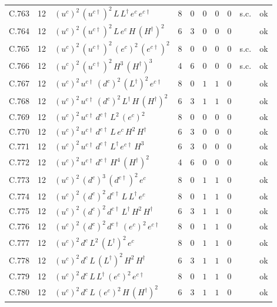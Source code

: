 {\begin{longtable}{@{}ll>{\raggedright\arraybackslash}p{6.4cm}rrllllr@{}}
C.763 & 12 & $(u^c)^{2}\,(u^{c\dagger})^{2}\,L\,L^\dagger\,e^c\,e^{c\dagger}$ & 8 & 0 & $0$ & $0$ & $0$ & s.c. & ok \\
C.764 & 12 & $(u^c)^{2}\,(u^{c\dagger})^{2}\,L\,e^c\,H\,(H^\dagger)^{2}$ & 6 & 3 & $0$ & $0$ & $0$ &  & ok \\
C.765 & 12 & $(u^c)^{2}\,(u^{c\dagger})^{2}\,(e^c)^{2}\,(e^{c\dagger})^{2}$ & 8 & 0 & $0$ & $0$ & $0$ & s.c. & ok \\
C.766 & 12 & $(u^c)^{2}\,(u^{c\dagger})^{2}\,H^{3}\,(H^\dagger)^{3}$ & 4 & 6 & $0$ & $0$ & $0$ & s.c. & ok \\
C.767 & 12 & $(u^c)^{2}\,u^{c\dagger}\,(d^c)^{2}\,(L^\dagger)^{2}\,e^{c\dagger}$ & 8 & 0 & $1$ & $1$ & $0$ &  & ok \\
C.768 & 12 & $(u^c)^{2}\,u^{c\dagger}\,(d^c)^{2}\,L^\dagger\,H\,(H^\dagger)^{2}$ & 6 & 3 & $1$ & $1$ & $0$ &  & ok \\
C.769 & 12 & $(u^c)^{2}\,u^{c\dagger}\,d^{c\dagger}\,L^{2}\,(e^c)^{2}$ & 8 & 0 & $0$ & $0$ & $0$ &  & ok \\
C.770 & 12 & $(u^c)^{2}\,u^{c\dagger}\,d^{c\dagger}\,L\,e^c\,H^{2}\,H^\dagger$ & 6 & 3 & $0$ & $0$ & $0$ &  & ok \\
C.771 & 12 & $(u^c)^{2}\,u^{c\dagger}\,d^{c\dagger}\,L^\dagger\,e^{c\dagger}\,H^{3}$ & 6 & 3 & $0$ & $0$ & $0$ &  & ok \\
C.772 & 12 & $(u^c)^{2}\,u^{c\dagger}\,d^{c\dagger}\,H^{4}\,(H^\dagger)^{2}$ & 4 & 6 & $0$ & $0$ & $0$ &  & ok \\
C.773 & 12 & $(u^c)^{2}\,(d^c)^{3}\,(d^{c\dagger})^{2}\,e^c$ & 8 & 0 & $1$ & $1$ & $0$ &  & ok \\
C.774 & 12 & $(u^c)^{2}\,(d^c)^{2}\,d^{c\dagger}\,L\,L^\dagger\,e^c$ & 8 & 0 & $1$ & $1$ & $0$ &  & ok \\
C.775 & 12 & $(u^c)^{2}\,(d^c)^{2}\,d^{c\dagger}\,L^\dagger\,H^{2}\,H^\dagger$ & 6 & 3 & $1$ & $1$ & $0$ &  & ok \\
C.776 & 12 & $(u^c)^{2}\,(d^c)^{2}\,d^{c\dagger}\,(e^c)^{2}\,e^{c\dagger}$ & 8 & 0 & $1$ & $1$ & $0$ &  & ok \\
C.777 & 12 & $(u^c)^{2}\,d^c\,L^{2}\,(L^\dagger)^{2}\,e^c$ & 8 & 0 & $1$ & $1$ & $0$ &  & ok \\
C.778 & 12 & $(u^c)^{2}\,d^c\,L\,(L^\dagger)^{2}\,H^{2}\,H^\dagger$ & 6 & 3 & $1$ & $1$ & $0$ &  & ok \\
C.779 & 12 & $(u^c)^{2}\,d^c\,L\,L^\dagger\,(e^c)^{2}\,e^{c\dagger}$ & 8 & 0 & $1$ & $1$ & $0$ &  & ok \\
C.780 & 12 & $(u^c)^{2}\,d^c\,L\,(e^c)^{2}\,H\,(H^\dagger)^{2}$ & 6 & 3 & $1$ & $1$ & $0$ &  & ok \\

\end{longtable}}
